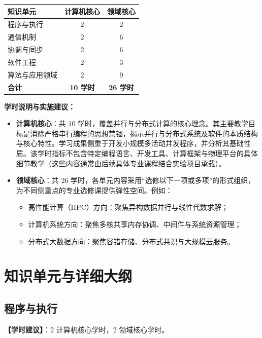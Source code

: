 \begin{table}[H]
\centering
\setlength{\tabcolsep}{3.5pt}\fontsize{8pt}{9.6pt}\selectfont\begin{tabularx}{\columnwidth}{Y c c}
\toprule
\textbf{知识单元} & \textbf{计算机核心} & \textbf{领域核心} \\
\midrule
程序与执行 & 2 & 2 \\
通信机制 & 2 & 6 \\
协调与同步 & 2 & 6 \\
软件工程 & 2 & 3 \\
算法与应用领域 & 2 & 9 \\
\midrule
\textbf{合计} & \textbf{10 学时} & \textbf{26 学时} \\
\bottomrule
\end{tabularx}
\end{table}

\textbf{学时说明与实施建议：}
\begin{itemize}
    \item \textbf{计算机核心}：共 10 学时，覆盖并行与分布式计算的核心理念。其主要教学目标是消除严格串行编程的思想禁锢，揭示并行与分布式系统及软件的本质结构与核心特性。学习成果侧重于开发小规模多活动并发程序，并分析其基础性质。该学时指标不包含特定编程语言、开发工具、计算框架与物理平台的具体细节教学（这些内容通常由后续具体专业课程结合实验项目承载）。
    \item \textbf{领域核心}：共 26 学时，各单元内容采用“选修以下一项或多项”的形式组织，为不同侧重点的专业选修课提供弹性空间。例如：
    \begin{itemize}
        \item 高性能计算（HPC）方向：聚焦异构数据并行与线性代数求解；
        \item 计算机系统方向：聚焦多核共享内存协调、中间件与系统资源管理；
        \item 分布式大数据方向：聚焦容错存储、分布式共识与大规模云服务。
    \end{itemize}
\end{itemize}

\section{知识单元与详细大纲}

\subsection{程序与执行}
\textbf{【学时建议】}：2 计算机核心学时，2 领域核心学时。

